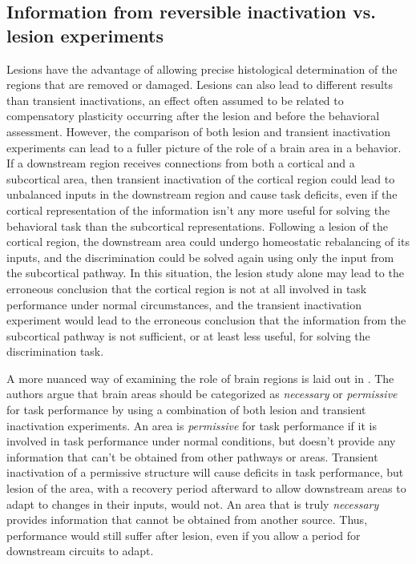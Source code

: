 \subsection{Information from reversible inactivation vs. lesion experiments}
Lesions have the advantage of allowing precise histological determination of the regions that are removed or damaged. 
%
Lesions can also lead to different results than transient inactivations, an effect often assumed to be related to compensatory plasticity occurring after the lesion and before the behavioral assessment. 
%
However, the comparison of both lesion and transient inactivation experiments can lead to a fuller picture of the role of a brain area in a behavior. 
%
If a downstream region receives connections from both a cortical and a subcortical area, then transient inactivation of the cortical region could lead to unbalanced inputs in the downstream region and cause task deficits, even if the cortical representation of the information isn't any more useful for solving the behavioral task than the subcortical representations. 
%
Following a lesion of the cortical region, the downstream area could undergo homeostatic rebalancing of its inputs, and the discrimination could be solved again using only the input from the subcortical pathway. 
%
In this situation, the lesion study alone may lead to the erroneous conclusion that the cortical region is not at all involved in task performance under normal circumstances, and the transient inactivation experiment would lead to the erroneous conclusion that the information from the subcortical pathway is not sufficient, or at least less useful, for solving the discrimination task. 

A more nuanced way of examining the role of brain regions is laid out in \citet{Otchy2015}. 
%
The authors argue that brain areas should be categorized as \emph{necessary} or \emph{permissive} for task performance by using a combination of both lesion and transient inactivation experiments. 
%
An area is \emph{permissive} for task performance if it is involved in task performance under normal conditions, but doesn't provide any information that can't be obtained from other pathways or areas. 
%
Transient inactivation of a permissive structure will cause deficits in task performance, but lesion of the area, with a recovery period afterward to allow downstream areas to adapt to changes in their inputs, would not.
%
An area that is truly \emph{necessary} provides information that cannot be obtained from another source. 
%
Thus, performance would still suffer after lesion, even if you allow a period for downstream circuits to adapt.

